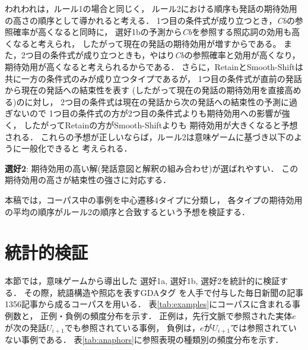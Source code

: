 われわれは，ルール1の場合と同じく，
ルール2における順序も発話の期待効用の高さの順序として導かれると考える．
1つ目の条件式が成り立つとき，{\it Cb}の参照確率が高くなると同時に，
選好1bの予測から{\it Cb}を参照する照応詞の効用も高くなると考えられ，
したがって現在の発話の期待効用が増すからである。
また，2つ目の条件式が成り立つときも，やはり{\it Cb}の参照確率と効用が高くなり，
期待効用が高くなると考えられるからである．
さらに，RetainとSmooth-Shiftは共に一方の条件式のみが成り立つタイプであるが，
1つ目の条件式が直前の発話から現在の発話への結束性を表す
(したがって現在の発話の期待効用を直接高める)のに対し，
2つ目の条件式は現在の発話から次の発話への結束性の予測に過ぎないので
1つ目の条件式の方が2つ目の条件式よりも期待効用への影響が強く，
したがってRetainの方がSmooth-Shiftよりも
期待効用が大きくなると予想される．
これらの予想が正しいならば，ルール2は意味ゲームに基づき以下のように一般化できると
考えられる．
\vspace{2mm}
\begin{breakbox}
\noindent
{\bf 選好2}: 期待効用の高い解(発話意図と解釈の組み合わせ)が選ばれやすい．
この期待効用の高さが結束性の強さに対応する．
\end{breakbox}

本稿では，コーパス中の事例を中心遷移4タイプに分類し，
各タイプの期待効用の平均の順序がルール2の順序と合致するという予想を検証する．


\section{統計的検証}\label{verification}
本節では，意味ゲームから導出した
選好1a, 選好1b, 選好2を統計的に検証する．
その際，統語構造や照応を表すGDAタグ\cite{GDA}
を人手で付与した毎日新聞の記事1356記事から成るコーパスを用いる．
表\ref{tab:examples}にコーパスに含まれる事例数と，
正例・負例の頻度分布を示す．
正例は，先行文脈で参照された実体$e$が次の発話$U_{i+1}$でも参照されている事例，
負例は，$e$が$U_{i+1}$では参照されていない事例である．
表\ref{tab:anaphors}に参照表現の種類別の頻度分布を示す．


